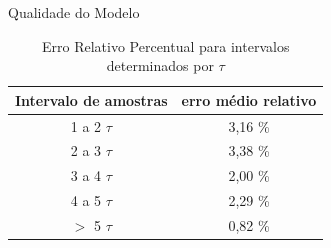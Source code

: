 \begin{frame}{Qualidade do Modelo}

\begin{table}[h]
\centering
\caption{Erro Relativo Percentual para intervalos determinados por $\tau$ }
\label{tab:ErroModeloTau}

\begin{tabular}{c|c}
\hline
Intervalo de amostras  &  erro médio relativo \\ \hline
\hline
1 a 2 $\tau$ &  3,16 \% \\ \hline
2 a 3 $\tau$ &  3,38 \% \\ \hline
3 a 4 $\tau$ &  2,00 \% \\ \hline
4 a 5 $\tau$ &  2,29 \% \\ \hline
$>$ 5 $\tau$ &  0,82 \% \\ \hline
\end{tabular}

\end{table}


\end{frame}

